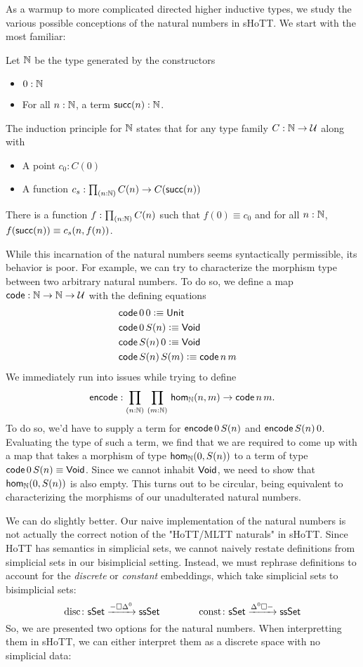 \documentclass[main.tex]{subfiles}
\begin{document}
As a warmup to more complicated directed higher inductive types, we study the various possible conceptions of the natural numbers in
 sHoTT. We start with the most familiar:
\begin{definition}
    Let $\N$ be the type generated by the constructors
    \begin{itemize}
       \item $0 : \N$
       \item For all $n : \N$, a term $\su(n) : \N$.
    \end{itemize}
    The induction principle for $\N$ states that for any type family $C : \N \to \U$ along with
    \begin{itemize}
       \item A point $c_0 : C(0)$
       \item A function $c_s : \prd{n:\N}C(n) \to C(\su(n))$
    \end{itemize}
   There is a function $f : \prd{n:\N}C(n)$ such that $f(0) \equiv c_0$ and for all $n : \N$, $f(\su(n)) \equiv c_s(n, f(n))$.
   
\end{definition}

While this incarnation of the natural numbers seems syntactically permissible, its behavior is poor. For example, we can try to 
characterize the morphism type between two arbitrary natural numbers. To do so, we define a map $\co : \N \to \N \to \U$ with the 
defining equations 
\begin{align*}
    &\co\,0\,0\defeq \Un&\\
    &\co\,0\,S(n) \defeq \vo&\\
    &\co\,S(n)\,0\defeq \vo&\\
    &\co\,S(n)\,S(m)\defeq \co \,n\,m&
\end{align*}
We immediately run into issues while trying to define $$\eco : \prd{n : \N}{m : \N} \ho[\N]{n}{m} \to \co\,n\,m.$$ To do so, we'd have to supply
a term for $\eco\,0\,S(n)$ and $\eco\,S(n)\,0$. Evaluating the type of such a term, we find that we are required to come up with a map
that takes a morphism of type $\ho[\N]{0}{S(n)}$ to a term of type $\co\,0\,S(n)\equiv \vo$. Since we cannot inhabit $\vo$, we need to show 
that $\ho[\N]{0}{S(n)}$ is also empty. This turns out to be circular, being equivalent to characterizing the morphisms of our unadulterated natural 
numbers. 

We can do slightly better. Our naive implementation of the natural numbers is not actually the correct notion of the "HoTT/MLTT naturals"
in sHoTT. Since HoTT has semantics in simplicial sets, we cannot naively restate definitions from simplicial sets in our bisimplicial setting.
Instead, we must rephrase definitions to account for the \textit{discrete} or \textit{constant} embeddings, which take simplicial sets to bisimplicial sets:
\[ \mathrm{disc} \colon \sSet \xrightarrow{-\square \Delta^0} \ssSet \qquad \qquad \mathrm{const} \colon \sSet \xrightarrow{\Delta^0\square-} \ssSet\]
So, we are presented two options for the natural numbers. When interpretting them in sHoTT, we can either interpret them as a discrete 
space with no simplicial data:
\end{document}
